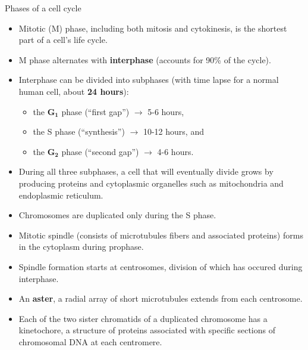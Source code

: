 \documentclass[11pt,ignorenonframetext,aspectratio=169]{beamer}
\providecommand{\tightlist}{%
  \setlength{\itemsep}{0pt}\setlength{\parskip}{0pt}}
\begin{document}
\begin{frame}{Phases of a cell cycle}
\protect\hypertarget{phases-of-a-cell-cycle}{}
\begin{itemize}
\tightlist
\item
  Mitotic (M) phase, including both mitosis and cytokinesis, is the
  shortest part of a cell's life cycle.
\item
  M phase alternates with \textbf{interphase} (accounts for 90\% of the
  cycle).
\item
  Interphase can be divided into subphases (with time lapse for a normal
  human cell, about \textbf{24 hours}):

  \begin{itemize}
  \tightlist
  \item
    the \(\mathbf{G_1}\) phase (``first gap'') \(\longrightarrow\) 5-6
    hours,
  \item
    the S phase (``synthesis'') \(\longrightarrow\) 10-12 hours, and
  \item
    the \(\mathbf{G_2}\) phase (``second gap'') \(\longrightarrow\) 4-6
    hours.
  \end{itemize}
\item
  During all three subphases, a cell that will eventually divide grows
  by producing proteins and cytoplasmic organelles such as mitochondria
  and endoplasmic reticulum.
\item
  Chromosomes are duplicated only during the S phase.
\end{itemize}
\end{frame}

\begin{frame}{}
\protect\hypertarget{section-10}{}
\begin{itemize}
\tightlist
\item
  Mitotic spindle (consists of microtubules fibers and associated
  proteins) forms in the cytoplasm during prophase.
\item
  Spindle formation starts at centrosomes, division of which has occured
  during interphase.
\item
  An \textbf{aster}, a radial array of short microtubules extends from
  each centrosome.
\item
  Each of the two sister chromatids of a duplicated chromosome has a
  kinetochore, a structure of proteins associated with specific sections
  of chromosomal DNA at each centromere.
\end{itemize}
\end{frame}
\end{document}
